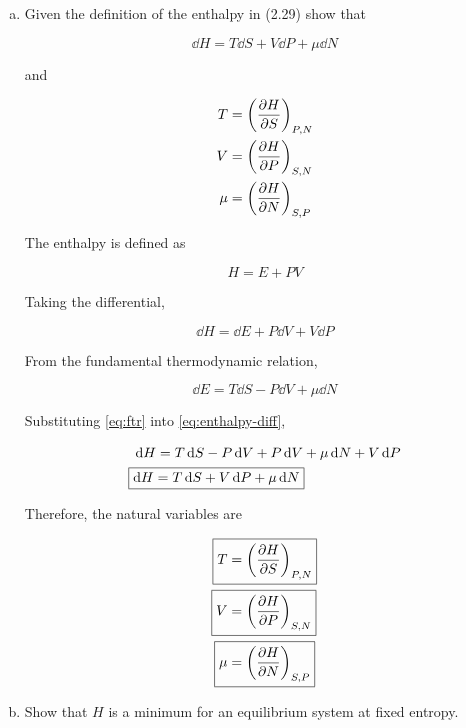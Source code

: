 \documentclass[9pt,a4paper,twocolumn]{article}
\begin{document}
\begin{enumerate}[(a)]

\item Given the definition of the enthalpy in (2.29) show that 

\begin{equation}
	\dd{H} = T\dd{S} + V\dd{P} + \mu\dd{N}
\end{equation}

and

\begin{align}
	T &= \left( \pdv{H}{S} \right)_{P,N} \\
	V &= \qty(\pdv{H}{P})_{S,N} \\
	\mu &= \qty(\pdv{H}{N})_{S,P}
\end{align}

The enthalpy is defined as

\begin{equation}\label{eq:enthalpy}
	H = E + PV
\end{equation}

Taking the differential,

\begin{equation}\label{eq:enthalpy-diff}
	\dd{H} = \dd{E} + P\dd{V} + V\dd{P}
\end{equation}

From the fundamental thermodynamic relation,

\begin{equation}\label{eq:ftr}
	\dd{E} = T\dd{S} - P\dd{V} + \mu\dd{N}
\end{equation}

Substituting \eqref{eq:ftr} into \eqref{eq:enthalpy-diff},

\begin{align}
	\dd{H} &= T\dd{S} - P\dd{V} + P\dd{V} + \mu\dd{N} + V\dd{P} \nonumber \\
	\Aboxed{
	\dd{H} &= T\dd{S} + V\dd{P} + \mu\dd{N}
	} \label{eq:answer-a}
\end{align}

Therefore, the natural variables are

\begin{align}
	\Aboxed{
		T &= \left( \pdv{H}{S} \right)_{P,N}
	} \\
	\Aboxed{
		V &= \qty(\pdv{H}{P})_{S,N}
	} \\
	\Aboxed{
		\mu &= \qty(\pdv{H}{N})_{S,P}
	}
\end{align}

\item Show that $H$ is a minimum for an equilibrium system at fixed entropy.


\end{enumerate}
\end{document}
